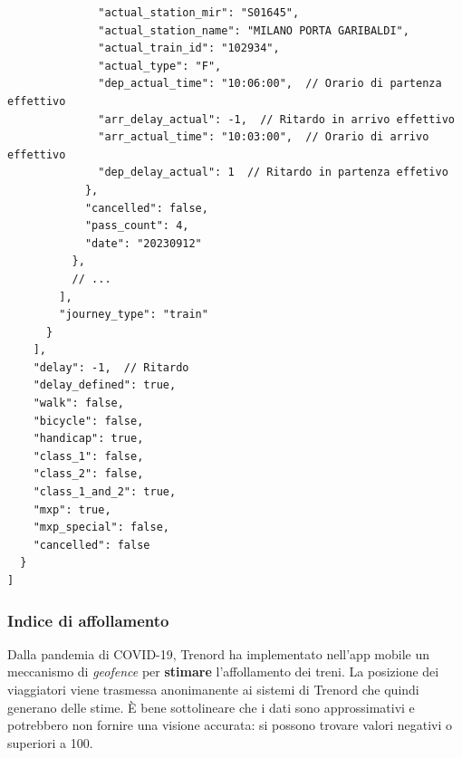 \documentclass[12pt,a4paper,italian]{report}
\begin{document}
\begin{verbatim}
              "actual_station_mir": "S01645",
              "actual_station_name": "MILANO PORTA GARIBALDI",
              "actual_train_id": "102934",
              "actual_type": "F",
              "dep_actual_time": "10:06:00",  // Orario di partenza effettivo
              "arr_delay_actual": -1,  // Ritardo in arrivo effettivo
              "arr_actual_time": "10:03:00",  // Orario di arrivo effettivo
              "dep_delay_actual": 1  // Ritardo in partenza effetivo
            },
            "cancelled": false,
            "pass_count": 4,
            "date": "20230912"
          },
          // ...
        ],
        "journey_type": "train"
      }
    ],
    "delay": -1,  // Ritardo
    "delay_defined": true,
    "walk": false,
    "bicycle": false,
    "handicap": true,
    "class_1": false,
    "class_2": false,
    "class_1_and_2": true,
    "mxp": true,
    "mxp_special": false,
    "cancelled": false
  }
]
\end{verbatim}

\subsubsection{Indice di affollamento}

Dalla pandemia di COVID-19, Trenord ha implementato nell'app mobile un
meccanismo di \textit{geofence} per \textbf{stimare} l'affollamento
dei treni.  La posizione dei viaggiatori viene trasmessa anonimanente
ai sistemi di Trenord che quindi generano delle stime.  È bene
sottolineare che i dati sono approssimativi e potrebbero non fornire
una visione accurata: si possono trovare valori negativi o
superiori a 100.
\end{document}
